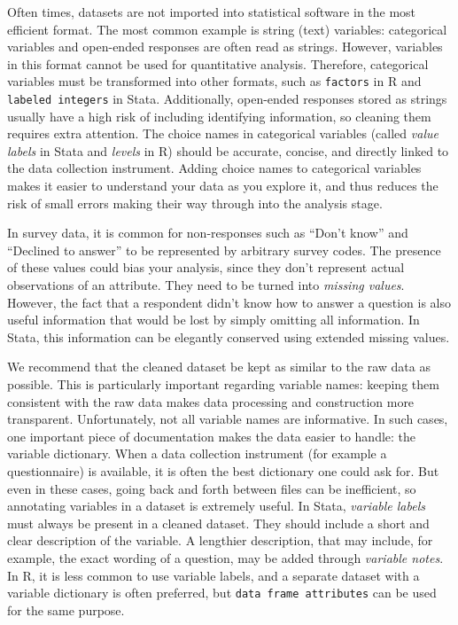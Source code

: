 Often times, datasets are not imported into statistical software in the most efficient format.
The most common example is string (text) variables:
categorical variables and open-ended responses are often read as strings.
However, variables in this format cannot be used for quantitative analysis.
Therefore, categorical variables must be transformed into other formats,
such as \texttt{factors} in R and \texttt{labeled integers} in Stata.
Additionally, open-ended responses stored as strings usually have a high risk of including identifying information,
so cleaning them requires extra attention.
The choice names in categorical variables
(called \textit{value labels} in Stata and \textit{levels} in R)
should be accurate, concise,
and directly linked to the data collection instrument.
Adding choice names to categorical variables
makes it easier to understand your data as you explore it,
and thus reduces the risk of small errors making their way through into the analysis stage.

In survey data, it is common for non-responses such as ``Don't know'' and ``Declined to answer''
to be represented by arbitrary survey codes.
The presence of these values could bias your analysis,
since they don't represent actual observations of an attribute.
They need to be turned into \textit{missing values}.
However, the fact that a respondent didn't know how to answer a question is also useful information
that would be lost by simply omitting all information.
In Stata, this information can be elegantly conserved using extended missing values.

We recommend that the cleaned dataset be kept as similar to the raw data as possible.
This is particularly important regarding variable names:
keeping them consistent with the raw data makes data processing and construction more transparent.
Unfortunately, not all variable names are informative.
In such cases, one important piece of documentation
 makes the data easier to handle: the variable dictionary.
When a data collection instrument (for example a questionnaire) is available,
it is often the best dictionary one could ask for.
But even in these cases, going back and forth between files can be inefficient,
so annotating variables in a dataset is extremely useful.
In Stata, \textit{variable labels}
must always be present in a cleaned dataset.
They should include a short and clear description of the variable.
A lengthier description, that may include, for example,
the exact wording of a question, may be added through \textit{variable notes}.
In R, it is less common to use variable labels,
and a separate dataset with a variable dictionary is often preferred,
but \texttt{data frame attributes} can be used for the same purpose.

